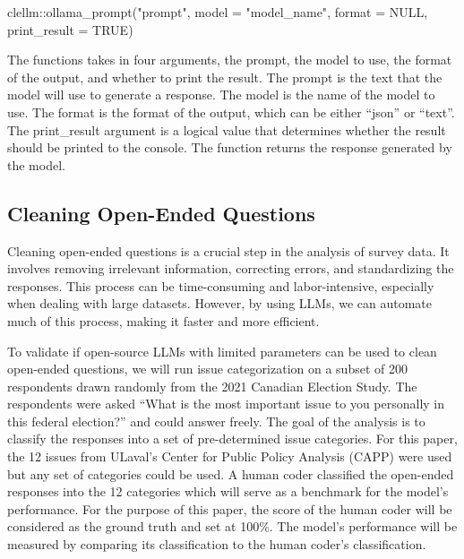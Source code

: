 \documentclass[
  authoryear,
  preprint,
  3p]{elsarticle}
\newenvironment{Shaded}{\begin{snugshade}}{\end{snugshade}}
\newcommand{\AttributeTok}[1]{\textcolor[rgb]{0.40,0.45,0.13}{#1}}
\newcommand{\ConstantTok}[1]{\textcolor[rgb]{0.56,0.35,0.01}{#1}}
\newcommand{\FunctionTok}[1]{\textcolor[rgb]{0.28,0.35,0.67}{#1}}
\newcommand{\NormalTok}[1]{\textcolor[rgb]{0.00,0.23,0.31}{#1}}
\newcommand{\SpecialCharTok}[1]{\textcolor[rgb]{0.37,0.37,0.37}{#1}}
\newcommand{\StringTok}[1]{\textcolor[rgb]{0.13,0.47,0.30}{#1}}
\begin{document}
\begin{Shaded}
\begin{Highlighting}[]
\NormalTok{clellm}\SpecialCharTok{::}\FunctionTok{ollama\_prompt}\NormalTok{(}\StringTok{"prompt"}\NormalTok{, }\AttributeTok{model =} \StringTok{"model\_name"}\NormalTok{, }\AttributeTok{format =} \ConstantTok{NULL}\NormalTok{, }\AttributeTok{print\_result =} \ConstantTok{TRUE}\NormalTok{) }
\end{Highlighting}
\end{Shaded}

The functions takes in four arguments, the prompt, the model to use, the
format of the output, and whether to print the result. The prompt is the
text that the model will use to generate a response. The model is the
name of the model to use. The format is the format of the output, which
can be either ``json'' or ``text''. The print\_result argument is a
logical value that determines whether the result should be printed to
the console. The function returns the response generated by the model.

\subsection{Cleaning Open-Ended
Questions}\label{cleaning-open-ended-questions}

Cleaning open-ended questions is a crucial step in the analysis of
survey data. It involves removing irrelevant information, correcting
errors, and standardizing the responses. This process can be
time-consuming and labor-intensive, especially when dealing with large
datasets. However, by using LLMs, we can automate much of this process,
making it faster and more efficient.

To validate if open-source LLMs with limited parameters can be used to
clean open-ended questions, we will run issue categorization on a subset
of 200 respondents drawn randomly from the 2021 Canadian Election Study.
The respondents were asked ``What is the most important issue to you
personally in this federal election?'' and could answer freely. The goal
of the analysis is to classify the responses into a set of
pre-determined issue categories. For this paper, the 12 issues from
ULaval's Center for Public Policy Analysis (CAPP) were used but any set
of categories could be used. A human coder classified the open-ended
responses into the 12 categories which will serve as a benchmark for the
model's performance. For the purpose of this paper, the score of the
human coder will be considered as the ground truth and set at 100\%. The
model's performance will be measured by comparing its classification to
the human coder's classification.
\end{document}
